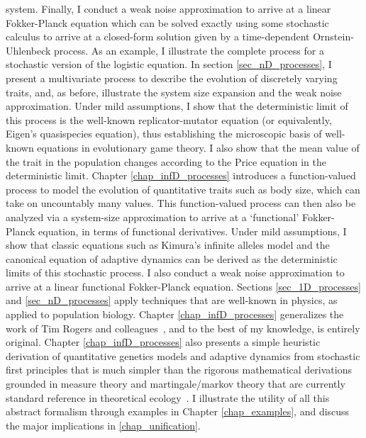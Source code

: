 system. Finally, I conduct a weak noise approximation to arrive at a linear Fokker-Planck equation which can be solved exactly using some stochastic calculus to arrive at a closed-form solution given by a time-dependent Ornstein-Uhlenbeck process. As an example, I illustrate the complete process for a stochastic version of the logistic equation. In section \ref{sec_nD_processes}, I present a multivariate process to describe the evolution of discretely varying traits, and, as before, illustrate the system size expansion and the weak noise approximation. Under mild assumptions, I show that the deterministic limit of this process is the well-known replicator-mutator equation (or equivalently, Eigen's quasispecies equation), thus establishing the microscopic basis of well-known equations in evolutionary game theory. I also show that the mean value of the trait in the population changes according to the Price equation in the deterministic limit. Chapter \ref{chap_infD_processes} introduces a function-valued process to model the evolution of quantitative traits such as body size, which can take on uncountably many values. This function-valued process can then also be analyzed via a system-size approximation to arrive at a `functional' Fokker-Planck equation, in terms of functional derivatives. Under mild assumptions, I show that classic equations such as Kimura's infinite alleles model and the canonical equation of adaptive dynamics can be derived as the deterministic limits of this stochastic process. I also conduct a weak noise approximation to arrive at a linear functional Fokker-Planck equation.  Sections \ref{sec_1D_processes} and \ref{sec_nD_processes} apply techniques that are well-known in physics, as applied to population biology. Chapter \ref{chap_infD_processes} generalizes the work of Tim Rogers and colleagues~\citep{rogers_demographic_2012,rogers_spontaneous_2012,rogers_modes_2015}, and to the best of my knowledge, is entirely original. Chapter \ref{chap_infD_processes} also presents a simple heuristic derivation of quantitative genetics models and adaptive dynamics from stochastic first principles that is much simpler than the rigorous mathematical derivations grounded in measure theory and martingale/markov theory that are currently standard reference in theoretical ecology~\citep{champagnat_individual_2008}. I illustrate the utility of all this abstract formalism through examples in Chapter \ref{chap_examples}, and discuss the major implications in \ref{chap_unification}.

